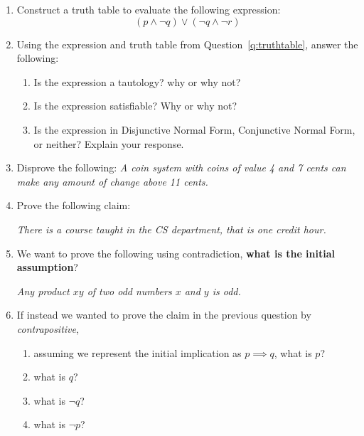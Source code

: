 \documentclass[11pt, oneside]{article}   	%
\begin{document}
\begin{enumerate}
\item \label{q:truthtable} Construct a truth table to evaluate the following expression:
\[
\left(p \wedge \neg q\right) \vee \left(\neg q \wedge \neg r\right)
\]
\vspace{18em}

\clearpage
\item Using the expression and truth table from Question~\ref{q:truthtable}, answer the following:
\begin{enumerate}
\item Is the expression a tautology? why or why not? \vspace{3em}
\item Is the expression satisfiable? Why or why not? \vspace{3em}
\item Is the expression in Disjunctive Normal Form, Conjunctive Normal Form, or neither? Explain your response. \vspace{3em}
\end{enumerate}

\item Disprove the following: \textit{A coin system with coins of value 4 and 7 cents can make any amount of change above 11 cents.}
\vspace{3em}


\item Prove the following claim: 
\begin{center}
\textit{There is a course taught in the CS department, that is one credit hour. }
\end{center}
\vspace{3em}

\item We want to prove the following using contradiction, \textbf{what is the initial assumption}?
\begin{center}
\textit{Any product $xy$ of two odd numbers $x$ and $y$ is odd.}
\end{center}
\vspace{3em}

\item If instead we wanted to prove the claim in the previous question by \textit{contrapositive}, 
\begin{enumerate}
\item assuming we represent the initial implication as $p \implies q$, what is $p$?
\vspace{2em}
\item what is $q$?
\vspace{2em}
\item what is $\neg q$?
\vspace{2em}
\item what is $\neg p$?
\vspace{2em}
\end{enumerate}


\end{enumerate}
\end{document}
